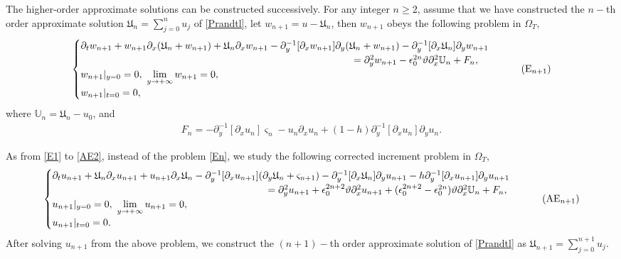 \documentclass{amsart}
\numberwithin{equation}{section}
\begin{document}
The higher-order approximate solutions can be constructed successively. For any integer $n\geq 2$, assume that we have constructed the $n-$th order approximate solution
$\mathfrak{U}_{n}=\sum\limits_{j=0}^{n}u_{j}$
of \eqref{Prandtl},
let $w_{n+1}=u-\mathfrak{U}_{n}$, then $w_{n+1}$ obeys the following problem in $\Omega_{T}$,
\begin{equation}\label{En}
\begin{cases}
\partial_{t}w_{n+1}
+w_{n+1}\partial_{x}(\mathfrak{U}_{n}+w_{n+1})
+\mathfrak{U}_{n}\partial_{x}w_{n+1}
-\partial_{y}^{-1}[\partial_{x}w_{n+1}]\partial_{y}(\mathfrak{U}_{n}+w_{n+1})
-\partial_{y}^{-1}[\partial_{x}\mathfrak{U}_{n}]\partial_{y}w_{n+1}\\
\hspace{3.8in}
=\partial_{y}^{2}w_{n+1}
-\epsilon_{0}^{2n}\vartheta\partial_{x}^{2}\mathbb{U}_{n}
+F_{n},\\
w_{n+1}|_{y=0}=0,~\lim\limits_{y\to+\infty} w_{n+1}=0,\\
w_{n+1}|_{t=0}=0,
\end{cases}\tag{E$_{n+1}$}
\end{equation}
where  $\mathbb{U}_{n}=\mathfrak{U}_{n}-u_{0}$, and
\begin{align}\label{Fn}
F_{n}
=-\partial_{y}^{-1}[\partial_{x}u_{n}]\varsigma_{n}
 -u_{n}\partial_{x}u_{n}
 +(1-h)\partial_{y}^{-1}[\partial_{x}u_{n}]\partial_{y}u_{n}.
\end{align}

As from \eqref{E1} to \eqref{AE2},  instead of the problem \eqref{En}, we study the following corrected increment problem in $\Omega_{T}$,
\begin{equation}\label{AEn+1}
\begin{cases}
\partial_{t}u_{n+1}
+\mathfrak{U}_{n}\partial_{x}u_{n+1}+u_{n+1}\partial_{x}\mathfrak{U}_{n}
-\partial_{y}^{-1}[\partial_{x}u_{n+1}](\partial_{y}\mathfrak{U}_{n}+\varsigma_{n+1})
-\partial_{y}^{-1}[\partial_{x}\mathfrak{U}_{n}]\partial_{y}u_{n+1}
-h\partial_{y}^{-1}[\partial_{x}u_{n+1}]\partial_{y}u_{n+1}\\
\hspace{3in}
=\partial_{y}^{2}u_{n+1}+\epsilon_{0}^{2n+2}\vartheta\partial_{x}^{2}u_{n+1}
+(\epsilon_{0}^{2n+2}-\epsilon_{0}^{2n})\vartheta\partial_{x}^{2}\mathbb{U}_{n}
+F_{n},\\
u_{n+1}|_{y=0}=0,~\lim\limits_{y\to+\infty} u_{n+1}=0,\\
u_{n+1}|_{t=0}=0.
\end{cases}\tag{AE$_{n+1}$}
\end{equation}
After solving $u_{n+1}$ from the above problem, we construct the $(n+1)-$th order approximate solution
of \eqref{Prandtl} as
$\mathfrak{U}_{n+1}=\sum\limits_{j=0}^{n+1}u_{j}$.
\end{document}
